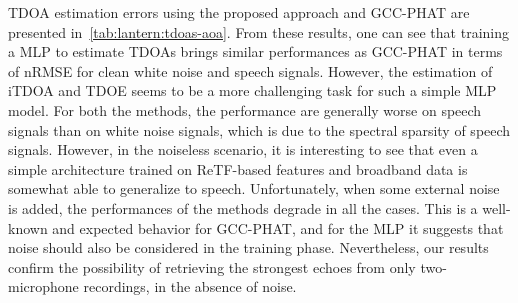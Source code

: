 \mynewline
\ac{TDOA} estimation errors using the proposed approach and \ac{GCC-PHAT} are presented in~\cref{tab:lantern:tdoas-aoa}.
From these results, one can see that training a \ac{MLP} to estimate \acp{TDOA} brings similar performances as \ac{GCC-PHAT} in terms of nRMSE for clean white noise and speech signals.
However, the estimation of \ac{iTDOA} and \ac{TDOE} seems to be a more challenging task for such a simple \ac{MLP} model.
For both the methods, the performance are generally worse on speech signals than on white noise signals, which is due to the spectral sparsity of speech signals.
However, in the noiseless scenario, it is interesting to see that even a simple architecture trained on \ac{ReTF}-based features and broadband data is somewhat able to generalize to speech.
Unfortunately, when some external noise is added, the performances of the methods degrade in all the cases.
This is a well-known and expected behavior for \ac{GCC-PHAT}, and for the \ac{MLP} it suggests that noise should also be considered in the training phase.
Nevertheless, our results confirm the possibility of retrieving the strongest echoes from only two-microphone recordings, in the absence of noise.

